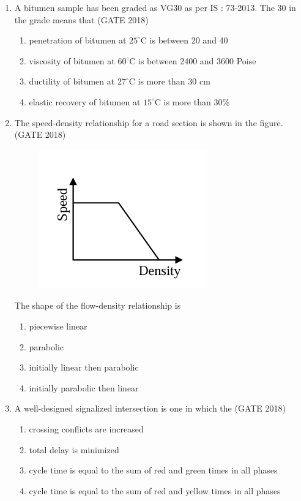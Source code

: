 \documentclass[journal,12pt,onecolumn]{IEEEtran}
\theoremstyle{remark}
\begin{document}
\begin{enumerate}
\item A bitumen sample has been graded as VG30 as per IS : 73-2013. The 30 in the grade means that \hfill{(GATE 2018)}

\begin{enumerate}
    \item penetration of bitumen at $25^\circ$C is between 20 and 40
    \item viscosity of bitumen at $60^\circ$C is between 2400 and 3600 Poise
    \item ductility of bitumen at $27^\circ$C is more than 30 cm
    \item elastic recovery of bitumen at $15^\circ$C is more than 30\%
\end{enumerate}

\vspace{1cm}

\item The speed-density relationship for a road section is shown in the figure. \hfill{(GATE 2018)}
\begin{figure}[h]
    \centering
    \includegraphics[width=0.5\linewidth]{GATE-CE-2018/15-1.png}
    \caption{}
    \label{15-1}
\end{figure}
The shape of the flow-density relationship is

\begin{enumerate}
    \item piecewise linear
    \item parabolic
    \item initially linear then parabolic
    \item initially parabolic then linear
\end{enumerate}

\vspace{1cm}
\newpage
\item A well-designed signalized intersection is one in which the \hfill{(GATE 2018)}

\begin{enumerate}
    \item crossing conflicts are increased
    \item total delay is minimized
    \item cycle time is equal to the sum of red and green times in all phases
    \item cycle time is equal to the sum of red and yellow times in all phases
\end{enumerate}


\end{enumerate}
\end{document}
